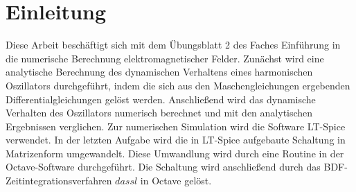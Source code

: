 \section*{Einleitung}\label{sec:intro}
Diese Arbeit beschäftigt sich mit dem Übungsblatt 2 des Faches \dq Einführung in die numerische Berechnung elektromagnetischer Felder\dq{}. Zunächst wird eine analytische Berechnung des dynamischen Verhaltens eines harmonischen Oszillators durchgeführt, indem die sich aus den Maschengleichungen ergebenden Differentialgleichungen gelöst werden. Anschließend wird das dynamische Verhalten des Oszillators numerisch berechnet und mit den analytischen Ergebnissen verglichen. Zur numerischen Simulation wird die Software \dq LT-Spice\dq{} verwendet. In der letzten Aufgabe wird die in LT-Spice aufgebaute Schaltung in Matrizenform umgewandelt. Diese Umwandlung wird durch eine Routine in der Octave-Software durchgeführt. Die Schaltung wird anschließend durch das BDF-Zeitintegrationsverfahren $dassl$ in Octave gelöst.